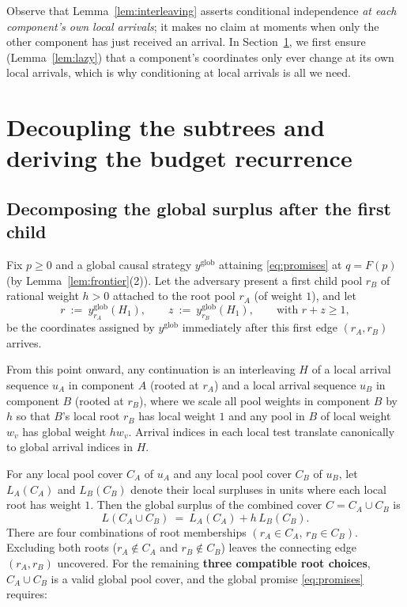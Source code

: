 \documentclass[11pt,letterpaper]{article}
\begin{document}
Observe that Lemma~\ref{lem:interleaving} asserts conditional independence \emph{at each component's own local arrivals}; it makes no claim at moments when only the other component has just received an arrival. In Section~\ref{sec:budgets}, we first ensure (Lemma~\ref{lem:lazy}) that a component's coordinates only ever change at its own local arrivals, which is why conditioning at local arrivals is all we need.

\section{Decoupling the subtrees and deriving the budget recurrence}\label{sec:budgets}

\subsection{Decomposing the global surplus after the first child}

Fix $p\ge 0$ and a global causal strategy $y^{\text{glob}}$ attaining \eqref{eq:promises} at $q=F(p)$ (by Lemma~\ref{lem:frontier}(2)). Let the adversary present a first child pool $r_B$ of rational weight $h>0$ attached to the root pool $r_A$ (of weight $1$), and let
\[
  r\ :=\ y^{\text{glob}}_{r_A}(H_1),\qquad z\ :=\ y^{\text{glob}}_{r_B}(H_1),\qquad\text{with } r+z\ge 1,
\]
be the coordinates assigned by $y^{\text{glob}}$ immediately after this first edge $(r_A,r_B)$ arrives.

From this point onward, any continuation is an interleaving $H$ of a local arrival sequence $u_A$ in component $A$ (rooted at $r_A$) and a local arrival sequence $u_B$ in component $B$ (rooted at $r_B$), where we scale all pool weights in component $B$ by $h$ so that $B$'s local root $r_B$ has local weight $1$ and any pool in $B$ of local weight $w_v$ has global weight $h w_v$. Arrival indices in each local test translate canonically to global arrival indices in $H$.

For any local pool cover $C_A$ of $u_A$ and any local pool cover $C_B$ of $u_B$, let $L_A(C_A)$ and $L_B(C_B)$ denote their local surpluses in units where each local root has weight $1$. Then the global surplus of the combined cover $C = C_A\cup C_B$ is
\[
  L(C_A\cup C_B)\ =\ L_A(C_A) + h\,L_B(C_B).
\]
There are four combinations of root memberships $(r_A\in C_A,\, r_B\in C_B)$. Excluding both roots ($r_A\notin C_A$ and $r_B\notin C_B$) leaves the connecting edge $(r_A,r_B)$ uncovered. For the remaining \textbf{three compatible root choices}, $C_A\cup C_B$ is a valid global pool cover, and the global promise \eqref{eq:promises} requires:
\end{document}
